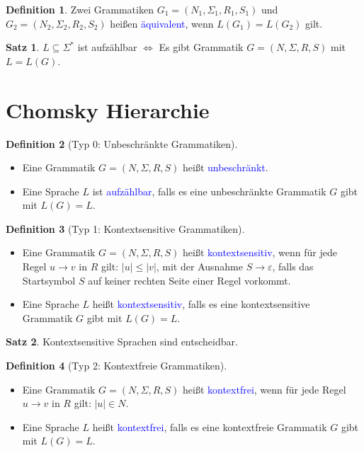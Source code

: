\documentclass{scrreprt}
\theoremstyle{definition}
\newtheorem{Definition}{Definition}[section]
\newtheorem{Satz}{Satz}[section]
\theoremstyle{example}
\theoremstyle{algorithm}
\begin{document}
\begin{Definition}
Zwei Grammatiken $G_1=(N_1,\Sigma_1,R_1,S_1)$ und $G_2=(N_2,\Sigma_2,R_2,S_2)$ heißen \textcolor{blue}{äquivalent}, wenn $L(G_1)=L(G_2)$ gilt.
\end{Definition}

\begin{Satz}
$L\subseteq\Sigma^*$ ist aufzählbar $\Leftrightarrow$ Es gibt Grammatik $G=(N,\Sigma,R,S)$ mit $L = L(G)$.
\end{Satz}

\section{Chomsky Hierarchie}
\begin{Definition}[Typ 0: Unbeschränkte Grammatiken]
\noindent
\begin{itemize}
\item
Eine Grammatik $G=(N,\Sigma,R,S)$ heißt \textcolor{blue}{unbeschränkt}.
\item
Eine Sprache $L$ ist \textcolor{blue}{aufzählbar}, falls es eine unbeschränkte Grammatik $G$ gibt mit $L(G)=L$.
\end{itemize}
\end{Definition}

\begin{Definition}[Typ 1: Kontextsensitive Grammatiken]
\noindent
\begin{itemize}
\item
Eine Grammatik $G=(N,\Sigma,R,S)$ heißt \textcolor{blue}{kontextsensitiv}, wenn für jede Regel $u\rightarrow v$ in $R$ gilt: $|u| \leq |v|$, mit der Ausnahme $S \rightarrow \varepsilon$, falls das Startsymbol $S$ auf keiner rechten Seite einer Regel vorkommt.
\item
Eine Sprache $L$ heißt \textcolor{blue}{kontextsensitiv}, falls es eine kontextsensitive Grammatik $G$ gibt mit $L(G)=L$.
\end{itemize}
\end{Definition}

\begin{Satz}
Kontextsensitive Sprachen sind entscheidbar.
\end{Satz}

\begin{Definition}[Typ 2: Kontextfreie Grammatiken]
\noindent
\begin{itemize}
\item
Eine Grammatik $G=(N,\Sigma,R,S)$ heißt \textcolor{blue}{kontextfrei}, wenn für jede Regel $u\rightarrow v$ in $R$ gilt: $|u| \in N$.
\item
Eine Sprache $L$ heißt \textcolor{blue}{kontextfrei}, falls es eine kontextfreie Grammatik $G$ gibt mit $L(G)=L$.
\end{itemize}
\end{Definition}
\end{document}
